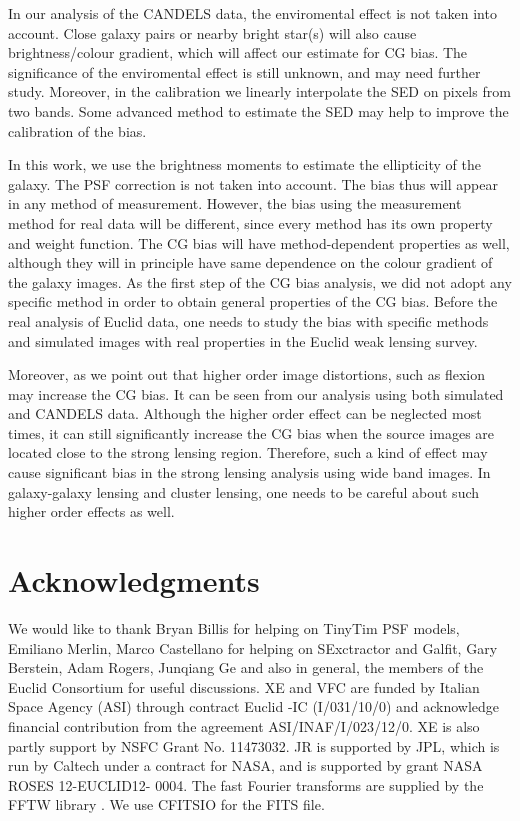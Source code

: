 \documentclass[useAMS,usenatbib]{mn2e}
\begin{document}
In our analysis of the CANDELS data, the enviromental effect is not
taken into account. Close galaxy pairs or nearby bright star(s) will
also cause brightness/colour gradient, which will affect our estimate
for CG bias. The significance of the enviromental effect is still
unknown, and may need further study. Moreover, in the calibration we
linearly interpolate the SED on pixels from two bands. Some advanced
method to estimate the SED \citep[e.g.][]{2016A&A...589A...2J} may
help to improve the calibration of the bias.

In this work, we use the brightness moments to estimate the
ellipticity of the galaxy. The PSF correction is not taken into
account. The bias thus will appear in any method of measurement.
However, the bias using the measurement method for real data
will be different, since every method has its own property and weight
function. The CG bias will have method-dependent properties as well,
although they will in principle have same dependence on the colour
gradient of the galaxy images. As the first step of the CG bias
analysis, we did not adopt any specific method in order to obtain
general properties of the CG bias. Before the real analysis of Euclid
data, one needs to study the bias with specific methods and simulated
images with real properties in the Euclid weak lensing survey.


%
Moreover, as we point out that higher order image distortions, such as
flexion may increase the CG bias. It can be seen from our analysis
using both simulated and CANDELS data. Although the higher order
effect can be neglected most times, it can still significantly
increase the CG bias when the source images are located close to the
strong lensing region. Therefore, such a kind of effect may cause
significant bias in the strong lensing analysis using wide band
images. In galaxy-galaxy lensing and cluster lensing, one needs to
be careful about such higher order effects as well.


\section*{Acknowledgments}

We would like to thank Bryan Billis for helping on TinyTim PSF models, Emiliano Merlin, Marco Castellano for helping on SExctractor and Galfit, Gary Berstein, Adam Rogers, Junqiang Ge and also in general, the members of the Euclid Consortium for useful discussions.
XE and VFC are funded by Italian Space Agency (ASI) through contract Euclid -IC (I/031/10/0) and acknowledge financial contribution from the agreement ASI/INAF/I/023/12/0. XE is also partly support by NSFC Grant No. 11473032. JR is supported by JPL, which is run by Caltech under a contract for NASA, and is supported by grant NASA ROSES 12-EUCLID12- 0004. The fast Fourier transforms are supplied by the FFTW library \citep{fftw05}. We use CFITSIO \citep{1999ASPC..172..487P} for the FITS file.
\end{document}

